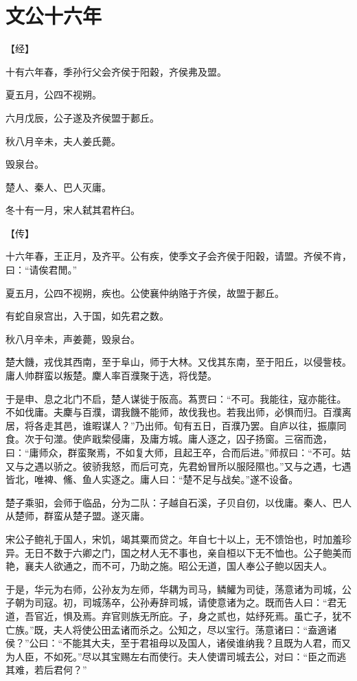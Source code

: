 \documentclass[a4paper,12pt,UTF8,twoside]{ctexbook}
\begin{document}
\chapter{文公十六年}



【经】

十有六年春，季孙行父会齐侯于阳穀，齐侯弗及盟。

夏五月，公四不视朔。

六月戊辰，公子遂及齐侯盟于郪丘。

秋八月辛未，夫人姜氏薨。

毁泉台。

楚人、秦人、巴人灭庸。

冬十有一月，宋人弑其君杵臼。

【传】

十六年春，王正月，及齐平。公有疾，使季文子会齐侯于阳穀，请盟。齐侯不肯，曰：“请俟君閒。”

夏五月，公四不视朔，疾也。公使襄仲纳赂于齐侯，故盟于郪丘。

有蛇自泉宫出，入于国，如先君之数。

秋八月辛未，声姜薨，毁泉台。

楚大饑，戎伐其西南，至于阜山，师于大林。又伐其东南，至于阳丘，以侵訾枝。庸人帅群蛮以叛楚。麇人率百濮聚于选，将伐楚。

于是申、息之北门不启，楚人谋徙于阪高。蒍贾曰：“不可。我能往，寇亦能往。不如伐庸。夫麇与百濮，谓我饑不能师，故伐我也。若我出师，必惧而归。百濮离居，将各走其邑，谁暇谋人？”乃出师。旬有五日，百濮乃罢。自庐以往，振廪同食。次于句澨。使庐戢棃侵庸，及庸方城。庸人逐之，囚子扬窗。三宿而逸，曰：“庸师众，群蛮聚焉，不如复大师，且起王卒，合而后进。”师叔曰：“不可。姑又与之遇以骄之。彼骄我怒，而后可克，先君蚡冒所以服陉隰也。”又与之遇，七遇皆北，唯裨、鯈、鱼人实逐之。庸人曰：“楚不足与战矣。”遂不设备。

楚子乘驲，会师于临品，分为二队：子越自石溪，子贝自仞，以伐庸。秦人、巴人从楚师，群蛮从楚子盟。遂灭庸。

宋公子鲍礼于国人，宋饥，竭其粟而贷之。年自七十以上，无不馈饴也，时加羞珍异。无日不数于六卿之门，国之材人无不事也，亲自桓以下无不恤也。公子鲍美而艳，襄夫人欲通之，而不可，乃助之施。昭公无道，国人奉公子鲍以因夫人。

于是，华元为右师，公孙友为左师，华耦为司马，鳞鱹为司徒，荡意诸为司城，公子朝为司寇。初，司城荡卒，公孙寿辞司城，请使意诸为之。既而告人曰：“君无道，吾官近，惧及焉。弃官则族无所庇。子，身之贰也，姑纾死焉。虽亡子，犹不亡族。”既，夫人将使公田孟诸而杀之。公知之，尽以宝行。荡意诸曰：“盍適诸侯？”公曰：“不能其大夫，至于君祖母以及国人，诸侯谁纳我？且既为人君，而又为人臣，不如死。”尽以其宝赐左右而使行。夫人使谓司城去公，对曰：“臣之而逃其难，若后君何？”
\end{document}

